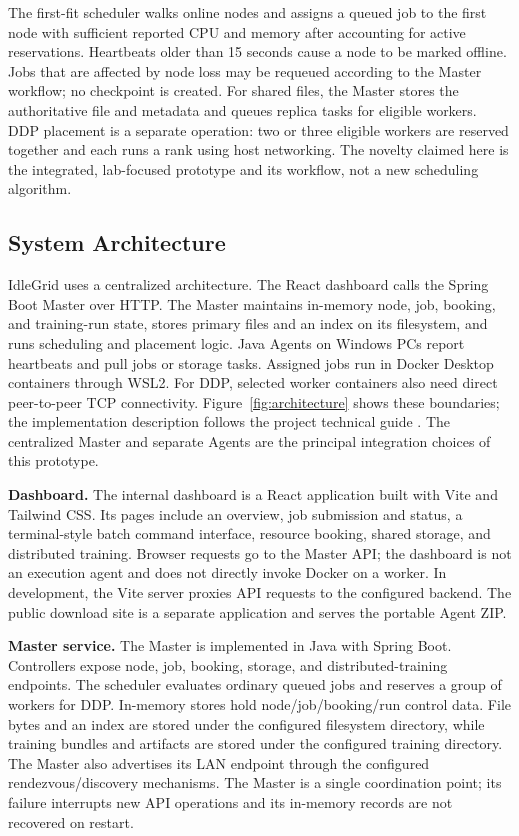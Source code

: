 \documentclass{article}
\begin{document}
The first-fit scheduler walks online nodes and assigns a queued job to the first node with sufficient reported CPU and memory after accounting for active reservations. Heartbeats older than 15 seconds cause a node to be marked offline. Jobs that are affected by node loss may be requeued according to the Master workflow; no checkpoint is created. For shared files, the Master stores the authoritative file and metadata and queues replica tasks for eligible workers. DDP placement is a separate operation: two or three eligible workers are reserved together and each runs a rank using host networking. The novelty claimed here is the integrated, lab-focused prototype and its workflow, not a new scheduling algorithm.
    
	\subsection{System Architecture}
IdleGrid uses a centralized architecture. The React dashboard calls the Spring Boot Master over HTTP. The Master maintains in-memory node, job, booking, and training-run state, stores primary files and an index on its filesystem, and runs scheduling and placement logic. Java Agents on Windows PCs report heartbeats and pull jobs or storage tasks. Assigned jobs run in Docker Desktop containers through WSL2. For DDP, selected worker containers also need direct peer-to-peer TCP connectivity. Figure~\ref{fig:architecture} shows these boundaries; the implementation description follows the project technical guide \cite{idlegridguide}. The centralized Master and separate Agents are the principal integration choices of this prototype.

\textbf{Dashboard.} The internal dashboard is a React application built with Vite and Tailwind CSS. Its pages include an overview, job submission and status, a terminal-style batch command interface, resource booking, shared storage, and distributed training. Browser requests go to the Master API; the dashboard is not an execution agent and does not directly invoke Docker on a worker. In development, the Vite server proxies API requests to the configured backend. The public download site is a separate application and serves the portable Agent ZIP.

\textbf{Master service.} The Master is implemented in Java with Spring Boot. Controllers expose node, job, booking, storage, and distributed-training endpoints. The scheduler evaluates ordinary queued jobs and reserves a group of workers for DDP. In-memory stores hold node/job/booking/run control data. File bytes and an index are stored under the configured filesystem directory, while training bundles and artifacts are stored under the configured training directory. The Master also advertises its LAN endpoint through the configured rendezvous/discovery mechanisms. The Master is a single coordination point; its failure interrupts new API operations and its in-memory records are not recovered on restart.
\end{document}
